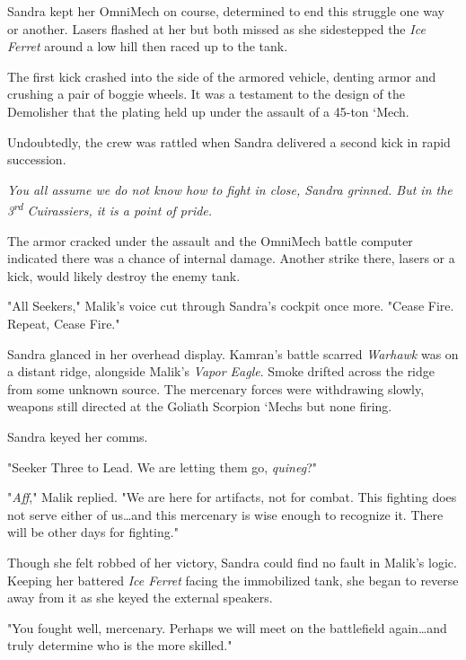 Sandra kept her OmniMech on course, determined to end this struggle one way or another.
Lasers flashed at her but both missed as she sidestepped the \emph{Ice Ferret} around a low hill then raced up to the tank.

The first kick crashed into the side of the armored vehicle, denting armor and crushing a pair of boggie wheels.
It was a testament to the design of the Demolisher that the plating held up under the assault of a 45-ton ‘Mech.

Undoubtedly, the crew was rattled when Sandra delivered a second kick in rapid succession.

\emph{
You all assume we do not know how to fight in close, Sandra grinned.
But in the 3\textsuperscript{rd} Cuirassiers, it is a point of pride.
}

The armor cracked under the assault and the OmniMech battle computer indicated there was a chance of internal damage.
Another strike there, lasers or a kick, would likely destroy the enemy tank.

"All Seekers," Malik's voice cut through Sandra's cockpit once more. "Cease Fire. Repeat, Cease Fire."

Sandra glanced in her overhead display. Kamran's battle scarred \emph{Warhawk} was on a distant ridge, alongside Malik's \emph{Vapor Eagle}.
Smoke drifted across the ridge from some unknown source.
The mercenary forces were withdrawing slowly, weapons still directed at the Goliath Scorpion ‘Mechs but none firing.

Sandra keyed her comms. 

"Seeker Three to Lead. We are letting them go, \emph{quineg}?"

"\emph{Aff}," Malik replied.
"We are here for artifacts, not for combat.
This fighting does not serve either of us{\ldots}and this mercenary is wise enough to recognize it.
There will be other days for fighting."

Though she felt robbed of her victory, Sandra could find no fault in Malik's logic.
Keeping her battered \emph{Ice Ferret} facing the immobilized tank, she began to reverse away from it as she keyed the external speakers. 

"You fought well, mercenary.
Perhaps we will meet on the battlefield again{\ldots}and truly determine who is the more skilled."

